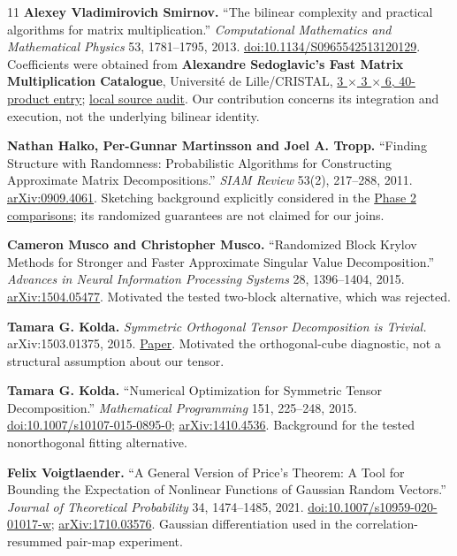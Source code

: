 \documentclass[11pt,letterpaper]{article}
\begin{document}
\begin{thebibliography}{11}
\textbf{Alexey Vladimirovich Smirnov.} ``The bilinear complexity and practical algorithms for matrix multiplication.'' \emph{Computational Mathematics and Mathematical Physics} 53, 1781--1795, 2013. \href{https://doi.org/10.1134/S0965542513120129}{doi:10.1134/S0965542513120129}. Coefficients were obtained from \textbf{Alexandre Sedoglavic's Fast Matrix Multiplication Catalogue}, Université de Lille/CRISTAL, \href{https://fmm.univ-lille.fr/3x3x6.html}{3 \(\times\) 3 \(\times\) 6, 40-product entry}; \href{https://github.com/mattliston/arc-whitebox-estimation-challenge/blob/main/experiments/arithmetic-kernels/mixed-rectangular-multiplication-optimistic-envelope-not-submission/MIXED_FMM_ENVELOPE_V2_VERDICT.md\#L39}{local source audit}. Our contribution concerns its integration and execution, not the underlying bilinear identity.

\textbf{Nathan Halko, Per-Gunnar Martinsson and Joel A. Tropp.} ``Finding Structure with Randomness: Probabilistic Algorithms for Constructing Approximate Matrix Decompositions.'' \emph{SIAM Review} 53(2), 217--288, 2011. \href{https://arxiv.org/abs/0909.4061}{arXiv:0909.4061}. Sketching background explicitly considered in the \href{https://github.com/mattliston/arc-whitebox-estimation-challenge/blob/main/records/TEAM_LOG_2026-10-01_to_10-22.md\#L283}{Phase 2 comparisons}; its randomized guarantees are not claimed for our joins.

\textbf{Cameron Musco and Christopher Musco.} ``Randomized Block Krylov Methods for Stronger and Faster Approximate Singular Value Decomposition.'' \emph{Advances in Neural Information Processing Systems} 28, 1396--1404, 2015. \href{https://arxiv.org/abs/1504.05477}{arXiv:1504.05477}. Motivated the tested two-block alternative, which was rejected.

\textbf{Tamara G. Kolda.} \emph{Symmetric Orthogonal Tensor Decomposition is Trivial.} arXiv:1503.01375, 2015. \href{https://arxiv.org/abs/1503.01375}{Paper}. Motivated the orthogonal-cube diagnostic, not a structural assumption about our tensor.

\textbf{Tamara G. Kolda.} ``Numerical Optimization for Symmetric Tensor Decomposition.'' \emph{Mathematical Programming} 151, 225--248, 2015. \href{https://doi.org/10.1007/s10107-015-0895-0}{doi:10.1007/s10107-015-0895-0}; \href{https://arxiv.org/abs/1410.4536}{arXiv:1410.4536}. Background for the tested nonorthogonal fitting alternative.

\textbf{Felix Voigtlaender.} ``A General Version of Price's Theorem: A Tool for Bounding the Expectation of Nonlinear Functions of Gaussian Random Vectors.'' \emph{Journal of Theoretical Probability} 34, 1474--1485, 2021. \href{https://doi.org/10.1007/s10959-020-01017-w}{doi:10.1007/s10959-020-01017-w}; \href{https://arxiv.org/abs/1710.03576}{arXiv:1710.03576}. Gaussian differentiation used in the correlation-resummed pair-map experiment.
\end{thebibliography}
\end{document}

